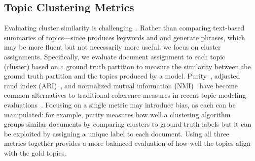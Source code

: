 \subsection{Topic Clustering Metrics}
Evaluating cluster similarity is challenging~\cite{NIPS2002_43e4e6a6}.
%
Rather than comparing text-based summaries of topics---since \lda{} produces keywords and \topicgpt{} and \lloom{} generate phrases, which may be more fluent but not necessarily more useful, we focus on cluster assignments.
%
Specifically, we evaluate document assignment to each topic (cluster) based on a ground truth partition to measure the similarity between the ground truth partition and the
topics produced by a model.
%
%
%
Purity~\cite{purity}, adjusted
rand index (ARI)~\cite{ARI}, and normalized mutual information (NMI)~\cite{NMI} have
become common alternatives to traditional coherence measures in recent topic modeling evaluations~\cite{pham2024topicgpt,li-etal-2024-improving, angelov-inkpen-2024-topic}.
%
%
%
Focusing on a single metric may introduce bias, as each can be manipulated:
%
for example, purity measures how well a clustering algorithm groups
similar documents by comparing clusters to ground truth labels but it can be exploited by assigning a unique label to each document.
%
Using all three metrics together provides a more balanced evaluation of how well the topics align with the gold topics.
%


